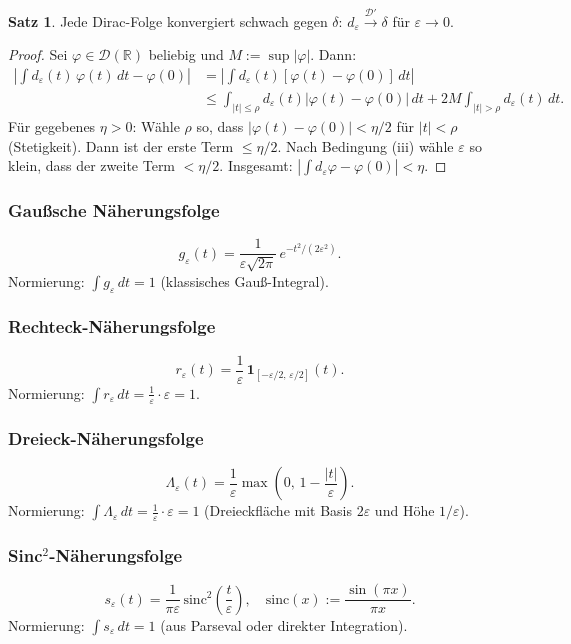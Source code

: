 ﻿\documentclass[a4paper,12pt]{article}
\theoremstyle{definition}
\newtheorem{satz}{Satz}
\begin{document}
\begin{satz}
Jede Dirac-Folge konvergiert schwach gegen $\delta$:
$d_\varepsilon \xrightarrow{\mathcal{D}'} \delta$ f\"ur $\varepsilon \to 0$.
\end{satz}

\begin{proof}
Sei $\varphi \in \mathcal{D}(\mathbb{R})$ beliebig und $M := \sup|\varphi|$. Dann:
\begin{align*}
\left|\int d_\varepsilon(t)\,\varphi(t)\,dt - \varphi(0)\right|
&= \left|\int d_\varepsilon(t)[\varphi(t)-\varphi(0)]\,dt\right| \\
&\leq \int_{|t|\leq\rho} d_\varepsilon(t)|\varphi(t)-\varphi(0)|\,dt
    + 2M\int_{|t|>\rho} d_\varepsilon(t)\,dt.
\end{align*}
F\"ur gegebenes $\eta > 0$: W\"ahle $\rho$ so, dass $|\varphi(t)-\varphi(0)| < \eta/2$
f\"ur $|t| < \rho$ (Stetigkeit). Dann ist der erste Term $\leq \eta/2$.
Nach Bedingung (iii) w\"ahle $\varepsilon$ so klein, dass der zweite Term $< \eta/2$.
Insgesamt: $|\int d_\varepsilon \varphi - \varphi(0)| < \eta$. \qedhere
\end{proof}

\subsubsection{Gau{\ss}sche N\"aherungsfolge}
\[
g_\varepsilon(t) = \frac{1}{\varepsilon\sqrt{2\pi}}\,e^{-t^2/(2\varepsilon^2)}.
\]
Normierung: $\int g_\varepsilon\,dt = 1$ (klassisches Gau{\ss}-Integral).

\subsubsection{Rechteck-N\"aherungsfolge}
\[
r_\varepsilon(t) = \frac{1}{\varepsilon}\,\mathbf{1}_{[-\varepsilon/2,\,\varepsilon/2]}(t).
\]
Normierung: $\int r_\varepsilon\,dt = \frac{1}{\varepsilon}\cdot\varepsilon = 1$.

\subsubsection{Dreieck-N\"aherungsfolge}
\[
\Lambda_\varepsilon(t) = \frac{1}{\varepsilon}\max\!\left(0,\, 1 - \frac{|t|}{\varepsilon}\right).
\]
Normierung: $\int \Lambda_\varepsilon\,dt = \frac{1}{\varepsilon}\cdot\varepsilon = 1$
(Dreieckfl\"ache mit Basis $2\varepsilon$ und H\"ohe $1/\varepsilon$).

\subsubsection{Sinc$^2$-N\"aherungsfolge}
\[
s_\varepsilon(t) = \frac{1}{\pi\varepsilon}\,\mathrm{sinc}^2\!\left(\frac{t}{\varepsilon}\right),
\quad \mathrm{sinc}(x) := \frac{\sin(\pi x)}{\pi x}.
\]
Normierung: $\int s_\varepsilon\,dt = 1$ (aus Parseval oder direkter Integration).
\end{document}
